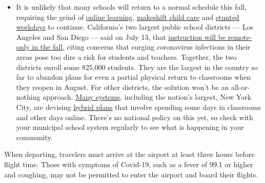 \begin{itemize}
  \begin{itemize}
  \tightlist
  \item
    It is unlikely that many schools will return to a normal schedule
    this fall, requiring the grind of
    \href{https://www.nytimes.com/2020/06/05/us/coronavirus-education-lost-learning.html?action=click\&pgtype=Article\&state=default\&region=MAIN_CONTENT_3\&context=storylines_faq}{online
    learning},
    \href{https://www.nytimes.com/2020/05/29/us/coronavirus-child-care-centers.html?action=click\&pgtype=Article\&state=default\&region=MAIN_CONTENT_3\&context=storylines_faq}{makeshift
    child care} and
    \href{https://www.nytimes.com/2020/06/03/business/economy/coronavirus-working-women.html?action=click\&pgtype=Article\&state=default\&region=MAIN_CONTENT_3\&context=storylines_faq}{stunted
    workdays} to continue. California's two largest public school
    districts --- Los Angeles and San Diego --- said on July 13, that
    \href{https://www.nytimes.com/2020/07/13/us/lausd-san-diego-school-reopening.html?action=click\&pgtype=Article\&state=default\&region=MAIN_CONTENT_3\&context=storylines_faq}{instruction
    will be remote-only in the fall}, citing concerns that surging
    coronavirus infections in their areas pose too dire a risk for
    students and teachers. Together, the two districts enroll some
    825,000 students. They are the largest in the country so far to
    abandon plans for even a partial physical return to classrooms when
    they reopen in August. For other districts, the solution won't be an
    all-or-nothing approach.
    \href{https://bioethics.jhu.edu/research-and-outreach/projects/eschool-initiative/school-policy-tracker/}{Many
    systems}, including the nation's largest, New York City, are
    devising
    \href{https://www.nytimes.com/2020/06/26/us/coronavirus-schools-reopen-fall.html?action=click\&pgtype=Article\&state=default\&region=MAIN_CONTENT_3\&context=storylines_faq}{hybrid
    plans} that involve spending some days in classrooms and other days
    online. There's no national policy on this yet, so check with your
    municipal school system regularly to see what is happening in your
    community.
  \end{itemize}
\end{itemize}

When departing, travelers must arrive at the airport at least three
hours before flight time. Those with symptoms of Covid-19, such as a
fever of 99.1 or higher and coughing, may not be permitted to enter the
airport and board their flights.


